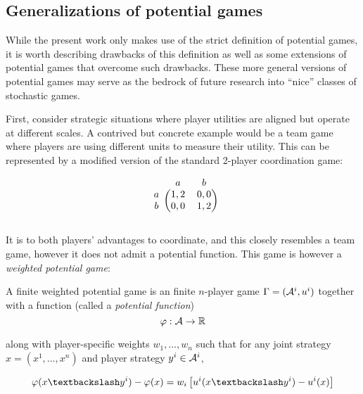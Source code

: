 \subsection{Generalizations of potential games}

While the present work only makes use of the strict definition of potential games, it is worth describing drawbacks of this definition as well as some extensions of potential games that overcome such drawbacks. These more general versions of potential games may serve as the bedrock of future research into ``nice'' classes of stochastic games.

First, consider strategic situations where player utilities are aligned but operate at different scales. A contrived but concrete example would be a team game where players are using different units to measure their utility. This can be represented by a modified version of the standard 2-player coordination game:

\begin{equation}

   \begin{blockarray}{ccc}
 & a & b \\
\begin{block}{c(cc)}
  a & 1,2 & 0,0  \\
  b & 0,0  & 1,2  \\
\end{block}
\end{blockarray} 

\label{eq:unitcoord}
\end{equation}

It is to both players' advantages to coordinate, and this closely resembles a team game, however it does not admit a potential function. This game is however a {\em weighted potential game}:

\begin{mydef}
A finite weighted potential game is an finite $n$-player game $\Gamma = (\AA^i, u^i)$ together with a function (called a {\em potential function}) 
$$
\phi: \AA \rightarrow \R
$$

along with player-specific weights $w_1, \ldots, w_n$ such that for any joint strategy $x = (x^1, \ldots, x^n)$ and player strategy $y^i \in \AA^i$,

$$
\phi(\asub{x}{y^i}) - \phi(x) = w_i \left[ u^i(\asub{x}{y^i}) - u^i(x) \right]
$$
\end{mydef}

